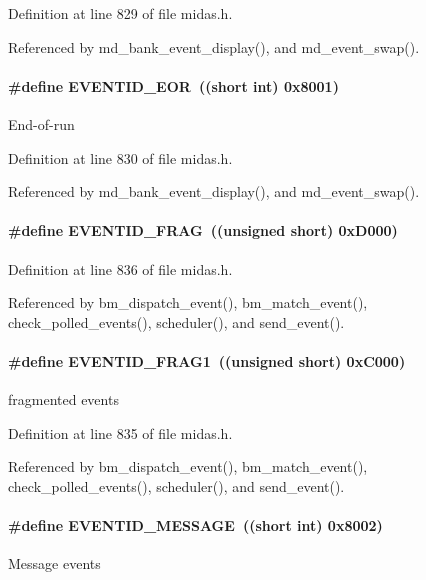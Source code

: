 Definition at line 829 of file midas.h.

Referenced by md\_\-bank\_\-event\_\-display(), and md\_\-event\_\-swap().
\paragraph[{EVENTID\_\-EOR}]{\setlength{\rightskip}{0pt plus 5cm}\#define EVENTID\_\-EOR~((short int) 0x8001)}\hfill\label{group__mbufferh_ga8f46d90b4c90a2387685d422625c654f}
End-\/of-\/run 

Definition at line 830 of file midas.h.

Referenced by md\_\-bank\_\-event\_\-display(), and md\_\-event\_\-swap().
\paragraph[{EVENTID\_\-FRAG}]{\setlength{\rightskip}{0pt plus 5cm}\#define EVENTID\_\-FRAG~((unsigned short) 0xD000)}\hfill\label{group__mbufferh_ga4fb6de5cc7e1f2da82266094a02d0ff7}


Definition at line 836 of file midas.h.

Referenced by bm\_\-dispatch\_\-event(), bm\_\-match\_\-event(), check\_\-polled\_\-events(), scheduler(), and send\_\-event().
\paragraph[{EVENTID\_\-FRAG1}]{\setlength{\rightskip}{0pt plus 5cm}\#define EVENTID\_\-FRAG1~((unsigned short) 0xC000)}\hfill\label{group__mbufferh_gaae07538917933e32355933ac1e2e3d60}
fragmented events 

Definition at line 835 of file midas.h.

Referenced by bm\_\-dispatch\_\-event(), bm\_\-match\_\-event(), check\_\-polled\_\-events(), scheduler(), and send\_\-event().
\paragraph[{EVENTID\_\-MESSAGE}]{\setlength{\rightskip}{0pt plus 5cm}\#define EVENTID\_\-MESSAGE~((short int) 0x8002)}\hfill\label{group__mbufferh_ga7fefe6ad78331e8cfb3d2b31dbfdd2d0}
Message events 

